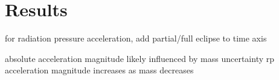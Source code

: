 \section{Results}

for radiation pressure acceleration, add partial/full eclipse to time axis

absolute acceleration magnitude likely influenced by mass uncertainty
rp acceleration magnitude increases as mass decreases
